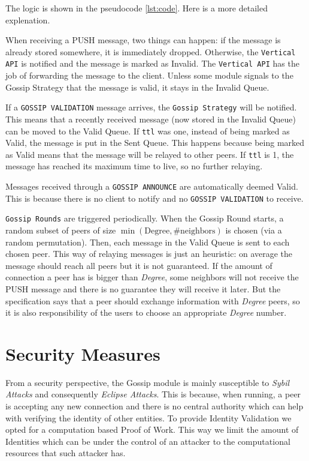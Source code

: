 \documentclass[a4paper,english,10pt,NET]{tumarticle}
\begin{document}
The logic is shown in the pseudocode \ref{lst:code}. Here is a more detailed explenation.

When receiving a PUSH message, two things can happen: if the message is already stored somewhere, it is immediately dropped. Otherwise, the \texttt{Vertical API} is notified and the message is marked as Invalid. The \texttt{Vertical API} has the job of forwarding the message to the client. Unless some module signals to the Gossip Strategy that the message is valid, it stays in the Invalid Queue.

If a \texttt{GOSSIP VALIDATION} message arrives, the \texttt{Gossip Strategy} will be notified. This means that a recently received message (now stored in the Invalid Queue) can be moved to the Valid Queue. If \texttt{ttl} was one, instead of being marked as Valid, the message is put in the Sent Queue. This happens because being marked as Valid means that the message will be relayed to other peers. If \texttt{ttl} is 1, the message has reached its maximum time to live, so no further relaying.

Messages received through a \texttt{GOSSIP ANNOUNCE} are automatically deemed Valid. This is because there is no client to notify and no \texttt{GOSSIP VALIDATION} to receive.

\texttt{Gossip Rounds} are triggered periodically. When the Gossip Round starts, a random subset of peers of size $\min(\text{Degree}, \text{\# neighbors})$ is chosen (via a random permutation). Then, each message in the Valid Queue is sent to each chosen peer. This way of relaying messages is just an heuristic: on average the message should reach all peers but it is not guaranteed. If the amount of connection a peer has is bigger than \textit{Degree}, some neighbors will not receive the PUSH message and there is no guarantee they will receive it later. But the specification says that a peer should exchange information with \textit{Degree} peers, so it is also responsibility of the users to choose an appropriate \textit{Degree} number.


\section{Security Measures} \label{sec:security}




From a security perspective, the Gossip module is mainly susceptible to \textit{Sybil Attacks} and consequently \textit{Eclipse Attacks}. This is because, when running, a peer is accepting any new connection and there is no central authority which can help with verifying the identity of other entities. To provide Identity Validation we opted for a computation based Proof of Work. This way we limit the amount of Identities which can be under the control of an attacker to the computational resources that such attacker has. 
\end{document}
